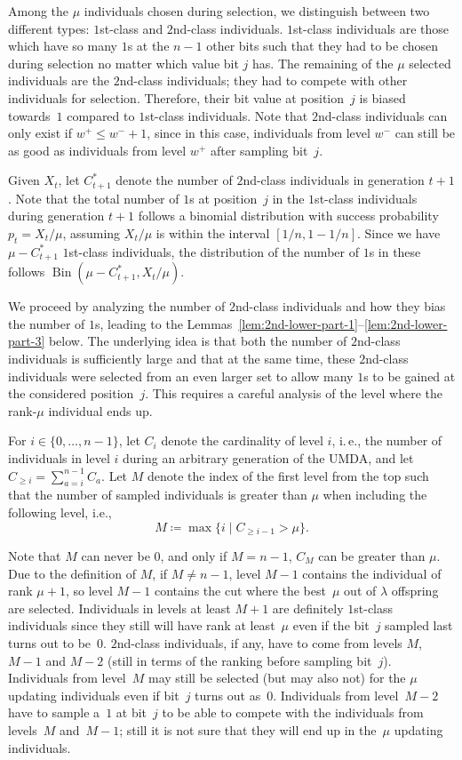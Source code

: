 \documentclass[11pt, a4paper]{article}
\newcommand{\umda}{UMDA\xspace}
\newcommand*{\cumulC}[1]{C_{\geq #1}}
\newcommand{\ie}{i.\,e.\xspace}
\DeclareMathOperator{\Bin}{Bin}
\begin{document}
Among the $\mu$ individuals chosen during selection, we distinguish between two different types: 
$1$st-class and $2$nd-class individuals. $1$st-class individuals are those which have so many $1$s at the $n-1$ 
other bits such that they 
had to be chosen 
during selection no matter which value bit $j$ has. The remaining of the $\mu$ selected individuals are 
the $2$nd-class individuals; they had to compete with other individuals for selection. Therefore, their bit value 
at position~$j$ is biased towards~$1$ compared to $1$st-class individuals. Note that $2$nd-class individuals 
can only exist if $w^+ \leq w^- + 1$, since in this case, individuals 
from level $w^-$ can still be as good as individuals from level $w^+$ after sampling bit~$j$.


Given $X_t$,  let $C_{t+1}^*$ denote the number of $2$nd-class individuals in 
generation $t + 1$. Note that the total number of $1$s at position~$j$ in the $1$st-class individuals 
during generation $t + 1$ follows a binomial distribution with success probability $p_t=X_t/\mu$, assuming 
$X_t/\mu$ is within the interval $[1/n,1-1/n]$. 
Since we have $\mu - C^*_{t+1}$ $1$st-class individuals, the distribution of the number of $1$s in  
these follows $\Bin(\mu - C^*_{t+1}, X_t/\mu)$.

We proceed by analyzing the number of $2$nd-class individuals and how they bias the 
number of $1$s, leading to the Lemmas~\ref{lem:2nd-lower-part-1}--\ref{lem:2nd-lower-part-3} 
below. The underlying idea is that 
both the number of $2$nd-class individuals is sufficiently large and that at the same 
time, these $2$nd-class individuals were selected from an even larger set  to allow 
many $1$s to be gained at the considered position~$j$. This requires a careful analysis 
of the level where the rank-$\mu$ individual ends up.

 
For 
$i \in \{0, \dots, n - 1\}$, let $C_i$ denote the cardinality of level $i$, 
\ie, the number of individuals in level $i$ during an arbitrary generation of the \umda, 
and let $\cumulC{i} = \sum_{a = i}^{n - 1} C_a$. 
Let $M$ denote the index of the first level from the top such that the number 
of sampled individuals is greater than $\mu$ when including the following level, i.e.,
\[
    M \coloneqq  \max \{i \mid \cumulC{i - 1} > \mu\}.
\]

Note that $M$ can never be $0$, and only if $M = n - 1$, $C_M$ can be greater than $\mu$. 
Due to the definition of $M$, if $M \neq n - 1$, level $M - 1$ contains the individual 
of rank $\mu + 1$, so level $M-1$ contains the cut where the best~$\mu$ out of $\lambda$ offspring 
are selected. Individuals in levels at least 
$M + 1$ are definitely $1$st-class individuals since they still will have rank at least~$\mu$ 
even if the  bit~$j$ sampled last turns out to be~$0$. $2$nd-class individuals, if any, have 
to come from levels $M$, $M - 1$ and $M-2$ (still in terms of the ranking before sampling bit~$j$). 
Individuals from level~$M$ may 
still be selected (but may also not) 
for the $\mu$ updating individuals 
even if bit~$j$ turns out as~$0$. Individuals from level~$M-2$ have to sample a~$1$ at bit~$j$ 
to be able to compete with the individuals from levels~$M$ and~$M-1$; still it is not sure that they 
will end up in the~$\mu$ updating individuals.
\end{document}
